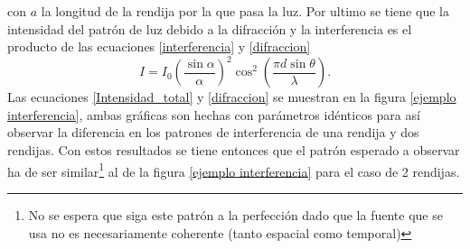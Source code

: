 \documentclass[%
 reprint,
 amsmath,amssymb,
 aps,
]{revtex4-1}
\begin{document}
con $a$ la longitud de la rendija por la que pasa la luz. Por ultimo se tiene que la intensidad del patrón de luz debido a la difracción y la interferencia es el producto de las ecuaciones \eqref{interferencia} y \eqref{difraccion}
\begin{equation}
I=I_0\left(\frac{\sin\alpha}{\alpha}\right)^2\cos^2\left(\frac{\pi d \sin\theta}{\lambda}\right).
\label{Intensidad_total}
\end{equation}
Las ecuaciones \eqref{Intensidad_total} y \eqref{difraccion} se muestran en la figura \ref{ejemplo interferencia}, ambas gráficas son hechas con parámetros idénticos para así observar la diferencia en los patrones de interferencia de una rendija y dos rendijas. Con estos resultados se tiene entonces que el patrón esperado a observar ha de ser similar\footnote{No se espera que siga este patrón a la perfección dado que la fuente que se usa no es necesariamente coherente (tanto espacial como temporal)} al de la figura \ref{ejemplo interferencia} para el caso de 2 rendijas. 

\end{document}
